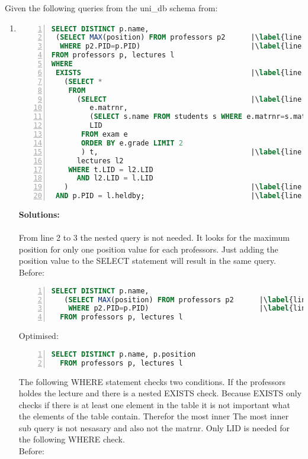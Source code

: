 
Given the following queries from the uni\_db schema from:

\begin{enumerate}
  \item \begin{lstlisting}[language=sql,numbers=left, stepnumber=1, numberstyle = \tiny,escapechar=|]
SELECT DISTINCT p.name,
 (SELECT MAX(position) FROM professors p2      |\label{line:max_prof}|
  WHERE p2.PID=p.PID)                          |\label{line:max_prof_2}|
FROM professors p, lectures l
WHERE 
 EXISTS                                        |\label{line:start_exist}|
   (SELECT *
    FROM
      (SELECT                                  |\label{line:start_simplify}|
         e.matrnr,
         (SELECT s.name FROM students s WHERE e.matrnr=s.matrnr),
         LID
       FROM exam e
       ORDER BY e.grade LIMIT 2
       ) t,                                    |\label{line:end_simplify}|
      lectures l2
    WHERE t.LID = l2.LID
      AND l2.LID = l.LID
   )                                           |\label{line:end_exist}|
 AND p.PID = l.heldby;                         |\label{line:outer_p_o_joinpred}| \end{lstlisting}

{\bf Solutions:}\\\\
From line 2 to 3 the nested query is not needed. It looks for the maximum position for only one position value for each professors. 
Just adding the position value to the SELECT statement will result in the same query.\\

Before:
\begin{lstlisting}[language=sql,numbers=left, stepnumber=1, numberstyle = \tiny,escapechar=|]
  SELECT DISTINCT p.name,
   (SELECT MAX(position) FROM professors p2      |\label{line:max_prof}|
    WHERE p2.PID=p.PID)                          |\label{line:max_prof_2}|
  FROM professors p, lectures l
\end{lstlisting}

Optimised:

\begin{lstlisting}[language=sql,numbers=left, stepnumber=1, numberstyle = \tiny,escapechar=|]
  SELECT DISTINCT p.name, p.position
  FROM professors p, lectures l
\end{lstlisting}
\newpage
The following WHERE statement checks two conditions. If the professors holdes the lecture and there is a nested EXISTS check. Because EXISTS only checks if there is at least one
element in the table it is not important what the elements of the table contain. Therefor the most inner The most inner sub query is not nesasary and also not the
matrnr. Only LID is needed for the following WHERE check.\\
Before:


\end{enumerate}
